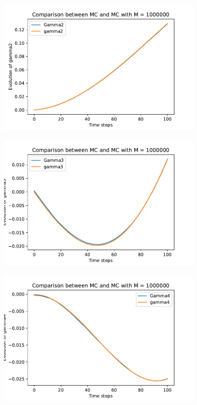 \documentclass[a4paper,11pt,openright]{report}
\begin{document}
\begin{figure}[H]
\centering
\includegraphics[width=0.9\textwidth]{gamma2 MC = 1000000.pdf}
\end{figure}
\begin{figure}[H]
\centering
\includegraphics[width=0.9\textwidth]{gamma3 MC = 1000000.pdf}
\end{figure}
\begin{figure}[H]
\centering
\includegraphics[width=0.9\textwidth]{gamma4 MC = 1000000.pdf}
\end{figure}
\end{document}
